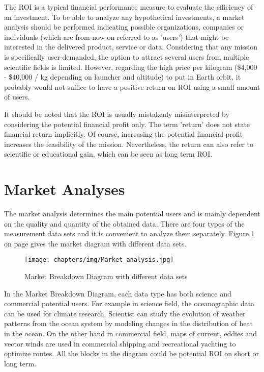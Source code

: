 The \ac{ROI} is a typical financial performance measure to evaluate the efficiency of an investment. To be able to analyze any hypothetical investments, a market analysis should be performed indicating possible organizations, companies or individuals (which are from now on referred to as 'users') that might be interested in the delivered product, service or data. Considering that any mission is specifically user-demanded, the option to attract several users from multiple scientific fields is limited. However, regarding the high price per kilogram (\$4,000 - \$40,000 / kg depending on launcher and altitude) to put in Earth orbit, it probably would not suffice to have a positive return on \acs{ROI} using a small amount of users. 

It should be noted that the \acs{ROI} is usually mistakenly misinterpreted by considering the potential financial profit only. The term 'return' does not state financial return implicitly. Of course, increasing the potential financial profit increases the feasibility of the mission. Nevertheless, the return can also refer to scientific or educational gain, which can be seen as long term \acs{ROI}. 

\section{Market Analyses}
  \label{blMAanalyses}
The market analysis determines the main potential users and is mainly dependent on the quality and quantity of the obtained data. There are four types of the measurement data sets and it is convenient to analyze them separately. Figure \ref{MA} on page \pageref{MA} gives the market diagram with different data sets.
\begin{figure} [h]
	\begin{center}
 \texttt{[image: chapters/img/Market\_analysis.jpg]}	
	\caption{Market Breakdown Diagram with different data sets\cite{Market}}
	\label{MA}
	\end{center}
\end{figure}
In the Market Breakdown Diagram, each data type has both science and commercial potential users. For example in science field, the oceanographic data can be used for climate research. Scientist can study the evolution of weather patterns from the ocean system by modeling changes in the distribution of heat in the ocean. On the other hand in commercial field, maps of current, eddies and vector winds are used in commercial shipping and recreational yachting to optimize routes. All the blocks in the diagram could be potential \acs{ROI} on short or long term.

